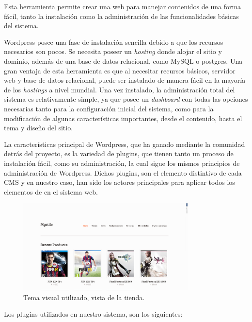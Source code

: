 Esta herramienta permite crear una web para manejar contenidos de una forma fácil,
tanto la instalación como la administración de las funcionalidades básicas del sistema.

Wordpress posee una fase de instalación sencilla debido a que los recursos
necesarios son pocos. Se necesita poseer un \emph{hosting} donde alojar el sitio y
dominio, además de una base de datos relacional, como MySQL o postgres.
Una gran ventaja de esta herramienta es que al necesitar recursos básicos,
servidor web y base de datos relacional, puede ser instalado de manera fácil en la
mayoría de los \emph{hostings} a nivel mundial.
Una vez instalado, la administración total del sistema es relativamente simple,
ya que posee un \emph{dashboard} con todas las opciones necesarias
tanto para la configuración inicial del sistema, como para la modificación
de algunas características importantes, desde el contenido, hasta el tema
y diseño del sitio.

La características principal de Wordpress, que ha ganado mediante
la comunidad detrás del proyecto, es la variedad de plugins, que
tienen tanto un proceso de instalación fácil, como su administración,
la cual sigue los mismos principios de administración de Wordpress.
Dichos plugins, son el elemento distintivo de cada CMS
y en nuestro caso, han sido los actores principales para aplicar
todos los elementos de {\GAM} en el sistema web.

\begin{figure}[!htb]
  \centering
  \includegraphics[width=0.8\textwidth]{images/SitioBase.png}
  \caption[TemaVisual]{Tema visual utilizado, vista de la tienda.}
  \label{fig:Players}
\end{figure}



Los plugins utilizados en nuestro sistema, son los siguientes:

